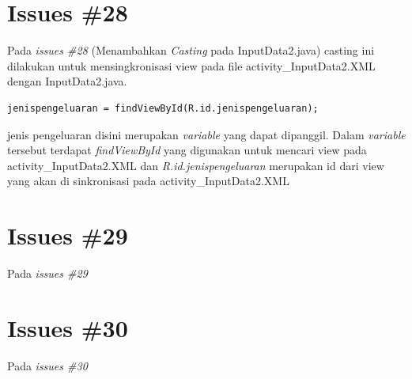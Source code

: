 \section{Issues \#28}
Pada \textit{issues \#28} (Menambahkan \textit{Casting} pada InputData2.java) casting ini dilakukan untuk mensingkronisasi view pada file activity\_InputData2.XML dengan InputData2.java.
\begin{verbatim}
jenispengeluaran = findViewById(R.id.jenispengeluaran);
\end{verbatim}
jenis pengeluaran disini merupakan \textit{variable} yang dapat dipanggil. Dalam \textit{variable} tersebut terdapat \textit{findViewById} yang digunakan untuk mencari view pada activity\_InputData2.XML dan \textit{R.id.jenispengeluaran} merupakan id dari view yang akan di sinkronisasi pada activity\_InputData2.XML


\section{Issues \#29}
Pada \textit{issues \#29}

\section{Issues \#30}
Pada \textit{issues \#30}